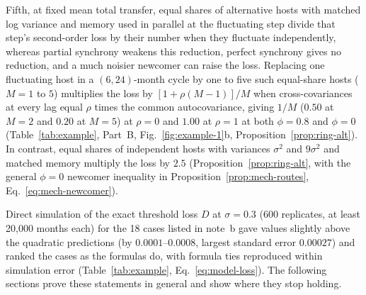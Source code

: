 Fifth, at fixed mean total transfer, equal shares of alternative hosts with matched log variance and memory used in parallel at the fluctuating step divide that step's second-order loss by their number when they fluctuate independently, whereas partial synchrony weakens this reduction, perfect synchrony gives no reduction, and a much noisier newcomer can raise the loss. Replacing one fluctuating host in a $(6, 24)$-month cycle by one to five such equal-share hosts ($M = 1$ to $5$) multiplies the loss by $[1 + \rho(M - 1)]/M$ when cross-covariances at every lag equal $\rho$ times the common autocovariance, giving $1/M$ ($0.50$ at $M = 2$ and $0.20$ at $M = 5$) at $\rho = 0$ and $1.00$ at $\rho = 1$ at both $\phi = 0.8$ and $\phi = 0$ (Table~\ref{tab:example}, Part~B, Fig.~\ref{fig:example-1}b, Proposition~\ref{prop:ring-alt}). In contrast, equal shares of independent hosts with variances $\sigma^2$ and $9\sigma^2$ and matched memory multiply the loss by $2.5$ (Proposition~\ref{prop:ring-alt}, with the general $\phi = 0$ newcomer inequality in Proposition~\ref{prop:mech-routes}, Eq.~\eqref{eq:mech-newcomer}).

Direct simulation of the exact threshold loss $D$ at $\sigma = 0.3$ (600 replicates, at least 20{,}000 months each) for the 18 cases listed in note~b gave values slightly above the quadratic predictions (by $0.0001$--$0.0008$, largest standard error $0.00027$) and ranked the cases as the formulas do, with formula ties reproduced within simulation error (Table~\ref{tab:example}, Eq.~\eqref{eq:model-loss}). The following sections prove these statements in general and show where they stop holding.
